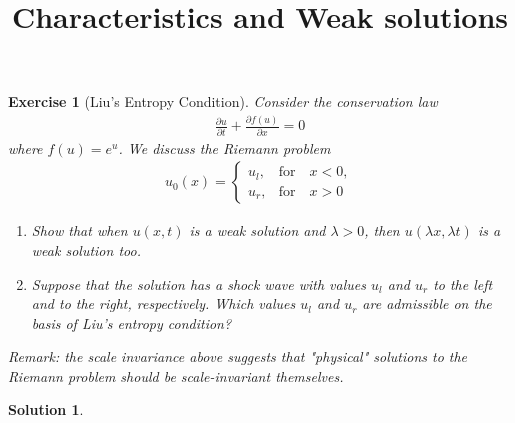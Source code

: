 \documentclass[10pt,letterpaper]{article}
\theoremstyle{break}
\newtheorem{exercise}{Exercise}
\newtheorem{solution}{Solution}
\begin{document}
\title{Characteristics and Weak solutions}
\date{}

\maketitle 






\begin{exercise}[Liu's Entropy Condition]
    Consider the conservation law 
    \begin{align}
    	\frac{\partial u}{\partial t}
    	+
    	\frac{\partial f(u)}{\partial x}
    	= 0 
    \end{align}
    where $f(u) = e^u$. We discuss the Riemann problem
    \begin{align}
    	u_0(x) = 
    	\left\{
    	\begin{array}{cl}
    	u_l, & \text{for} \quad x<0,\\
    	u_r, &\text{for} \quad x > 0
    	\end{array}
    	\right.
    \end{align}
    \begin{enumerate}
        \item Show that when $u(x,t)$ is a weak solution and $\lambda > 0$, then $u(\lambda x, \lambda t)$ is a weak solution too.
        \item Suppose that the solution has a shock wave with values $u_l$ and $u_r$ to the left and to the right, respectively.
        Which values $u_l$ and $u_r$ are admissible on the basis of Liu's entropy condition?
    \end{enumerate}
    \textit{Remark: the scale invariance above suggests that "physical" solutions to the Riemann problem should be scale-invariant themselves.}
\end{exercise}

\begin{solution}
    
\end{solution}
\end{document}

